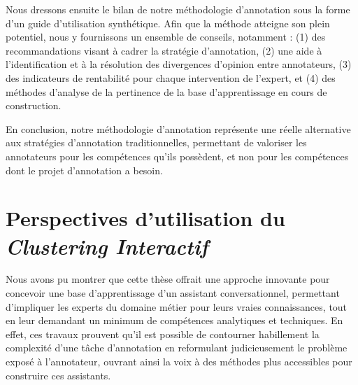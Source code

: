 		Nous dressons ensuite le bilan de notre méthodologie d'annotation sous la forme d'un guide d'utilisation synthétique.
		Afin que la méthode atteigne son plein potentiel, nous y fournissons un ensemble de conseils, notamment : (1) des recommandations visant à cadrer la stratégie d'annotation, (2) une aide à l'identification et à la résolution des divergences d'opinion entre annotateurs, (3) des indicateurs de rentabilité pour chaque intervention de l'expert, et (4) des méthodes d'analyse de la pertinence de la base d'apprentissage en cours de construction.
		
		En conclusion, notre méthodologie d'annotation représente une réelle alternative aux stratégies d'annotation traditionnelles, permettant de valoriser les annotateurs pour les compétences qu'ils possèdent, et non pour les compétences dont le projet d'annotation a besoin.
		
		
	\section*{Perspectives d'utilisation du \textit{Clustering Interactif}}
		
		Nous avons pu montrer que cette thèse offrait une approche innovante pour concevoir une base d'apprentissage d'un assistant conversationnel, permettant d'impliquer les experts du domaine métier pour leurs vraies connaissances, tout en leur demandant un minimum de compétences analytiques et techniques.
		En effet, ces travaux prouvent qu'il est possible de contourner habillement la complexité d'une tâche d'annotation en reformulant judicieusement le problème exposé à l'annotateur, ouvrant ainsi la voix à des méthodes plus accessibles pour construire ces assistants.

